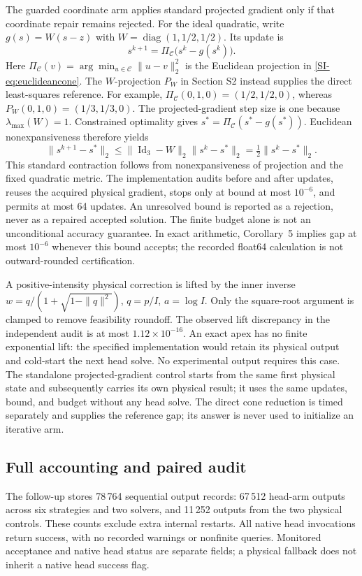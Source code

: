 The guarded coordinate arm applies standard projected gradient only if that coordinate repair remains rejected. For the ideal quadratic, write $g(s)=W(s-z)$ with $W=\operatorname{diag}(1,1/2,1/2)$. Its update is
\begin{equation}
 s^{k+1}=\Pi_{\mathcal C}\bigl(s^k-g(s^k)\bigr).
 \label{SI-eq:physicalpg}
\end{equation}
Here $\Pi_{\mathcal C}(v)=\arg\min_{u\in\mathcal C}\|u-v\|_2^2$ is the Euclidean projection in \eqref{SI-eq:euclideancone}. The $W$-projection $P_W$ in Section S2 instead supplies the direct least-squares reference. For example, $\Pi_{\mathcal C}(0,1,0)=(1/2,1/2,0)$, whereas $P_W(0,1,0)=(1/3,1/3,0)$. The projected-gradient step size is one because $\lambda_{\max}(W)=1$. Constrained optimality gives $s^*=\Pi_{\mathcal C}(s^*-g(s^*))$. Euclidean nonexpansiveness therefore yields
\begin{equation}
 \|s^{k+1}-s^*\|_2\le\|\operatorname{Id}_3-W\|_2\|s^k-s^*\|_2
 =\tfrac12\|s^k-s^*\|_2.
 \label{SI-eq:pgcontraction}
\end{equation}
This standard contraction follows from nonexpansiveness of projection and the fixed quadratic metric. The implementation audits before and after updates, reuses the acquired physical gradient, stops only at bound at most $10^{-6}$, and permits at most 64 updates. An unresolved bound is reported as a rejection, never as a repaired accepted solution. The finite budget alone is not an unconditional accuracy guarantee. In exact arithmetic, Corollary~5 implies gap at most $10^{-6}$ whenever this bound accepts; the recorded float64 calculation is not outward-rounded certification.

A positive-intensity physical correction is lifted by the inner inverse $w=q/(1+\sqrt{1-\|q\|^2})$, $q=p/I$, $a=\log I$. Only the square-root argument is clamped to remove feasibility roundoff. The observed lift discrepancy in the independent audit is at most $1.12\times10^{-16}$. An exact apex has no finite exponential lift: the specified implementation would retain its physical output and cold-start the next head solve. No experimental output requires this case. The standalone projected-gradient control starts from the same first physical state and subsequently carries its own physical result; it uses the same updates, bound, and budget without any head solve. The direct cone reduction is timed separately and supplies the reference gap; its answer is never used to initialize an iterative arm.

\subsection{Full accounting and paired audit}
The follow-up stores 78\,764 sequential output records: 67\,512 head-arm outputs across six strategies and two solvers, and 11\,252 outputs from the two physical controls. These counts exclude extra internal restarts. All native head invocations return success, with no recorded warnings or nonfinite queries. Monitored acceptance and native head status are separate fields; a physical fallback does not inherit a native head success flag.

